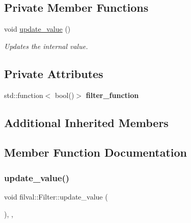 \subsection*{Private Member Functions}
\begin{DoxyCompactItemize}
\item 
void \hyperlink{classfilval_1_1Filter_ac91ccc66b66c8ea8cdad27fd9b4b62e2}{update\+\_\+value} ()
\begin{DoxyCompactList}\small\item\em Updates the internal value. \end{DoxyCompactList}\end{DoxyCompactItemize}
\subsection*{Private Attributes}
\begin{DoxyCompactItemize}
\item 
\hypertarget{classfilval_1_1Filter_a6b817ef97f9735fd73191bb187a9ace5}{}\label{classfilval_1_1Filter_a6b817ef97f9735fd73191bb187a9ace5} 
std\+::function$<$ bool()$>$ {\bfseries filter\+\_\+function}
\end{DoxyCompactItemize}
\subsection*{Additional Inherited Members}


\subsection{Member Function Documentation}
\hypertarget{classfilval_1_1Filter_ac91ccc66b66c8ea8cdad27fd9b4b62e2}{}\label{classfilval_1_1Filter_ac91ccc66b66c8ea8cdad27fd9b4b62e2} 
\subsubsection{\texorpdfstring{update\+\_\+value()}{update\_value()}}
{\footnotesize\ttfamily void filval\+::\+Filter\+::update\+\_\+value (\begin{DoxyParamCaption}{ }\end{DoxyParamCaption})\hspace{0.3cm}{\ttfamily [inline]}, {\ttfamily [private]}, {\ttfamily [virtual]}}




